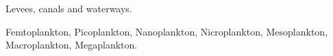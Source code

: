 \documentclass[11pt]{exam}
\begin{document}
\begin{questions}
\begin{solution}
	Levees, canals and waterways.
\end{solution}

\begin{solution}
Femtoplankton, Picoplankton, Nanoplankton, Nicroplankton, Mesoplankton, Macroplankton, Megaplankton.
\end{solution}



\end{questions}
\end{document}
